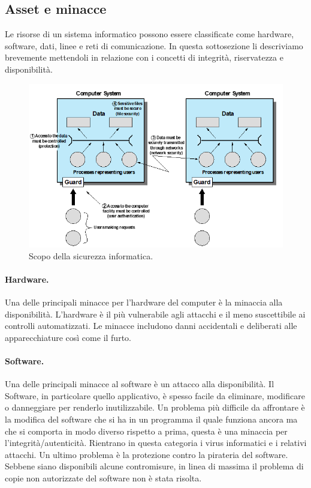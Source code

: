 \subsection{Asset e minacce}

Le risorse di un sistema informatico possono essere classificate come hardware,
software, dati, linee e reti di comunicazione. In questa sottosezione li
descriviamo brevemente mettendoli in relazione con i concetti di integrità,
riservatezza e disponibilità.

\begin{figure}[H]
    \centering
    \includegraphics[width=14cm, keepaspectratio]{capitoli/cap_1/imgs/asset_sec.png}
    \caption{ Scopo della sicurezza informatica.}\label{fig:asset_sec}
\end{figure}

\paragraph{Hardware.}
Una delle principali minacce per l'hardware  del computer è la minaccia alla
disponibilità. L'hardware è il più vulnerabile agli attacchi e il meno
suscettibile ai controlli automatizzati. Le minacce includono danni accidentali
e deliberati alle apparecchiature così come il furto.


\paragraph{Software.}
Una delle principali minacce al software è un attacco alla disponibilità.
Il Software, in particolare quello applicativo, è spesso facile da eliminare,
modificare o danneggiare per renderlo inutilizzabile.
Un problema più difficile da affrontare è la modifica del software che si ha in
un programma il quale funziona ancora ma che si comporta in modo diverso rispetto
a prima, questa è una minaccia per l'integrità/autenticità.
Rientrano in questa categoria i virus informatici e i relativi attacchi.
Un ultimo problema è la protezione contro la pirateria del software.
Sebbene siano disponibili alcune contromisure, in linea di massima il problema
di copie non autorizzate del software non è stata risolta.

